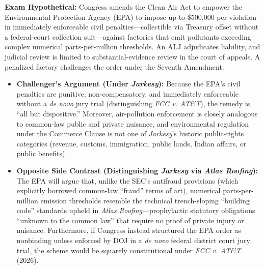 \documentclass[12pt]{article}
\begin{document}
\textbf{Exam Hypothetical:} Congress amends the Clean Air Act to empower the Environmental Protection Agency (EPA) to impose up to \$500,000 per violation in immediately enforceable civil penalties---collectible via Treasury offset without a federal-court collection suit---against factories that emit pollutants exceeding complex numerical parts-per-million thresholds. An ALJ adjudicates liability, and judicial review is limited to substantial-evidence review in the court of appeals. A penalized factory challenges the order under the Seventh Amendment.
\begin{itemize}
  \item \textbf{Challenger's Argument (Under \textit{Jarkesy}):} Because the EPA's civil penalties are punitive, non-compensatory, and immediately enforceable without a \textit{de novo} jury trial (distinguishing \textit{FCC v. AT\&T}), the remedy is ``all but dispositive.'' Moreover, air-pollution enforcement is closely analogous to common-law public and private nuisance, and environmental regulation under the Commerce Clause is not one of \textit{Jarkesy}'s historic public-rights categories (revenue, customs, immigration, public lands, Indian affairs, or public benefits).
  \item \textbf{Opposite Side Contrast (Distinguishing \textit{Jarkesy} via \textit{Atlas Roofing}):} The EPA will argue that, unlike the SEC's antifraud provisions (which explicitly borrowed common-law ``fraud'' terms of art), numerical parts-per-million emission thresholds resemble the technical trench-sloping ``building code'' standards upheld in \textit{Atlas Roofing}---prophylactic statutory obligations ``unknown to the common law'' that require no proof of private injury or nuisance. Furthermore, if Congress instead structured the EPA order as nonbinding unless enforced by DOJ in a \textit{de novo} federal district court jury trial, the scheme would be squarely constitutional under \textit{FCC v. AT\&T} (2026).
\end{itemize}
\end{document}
